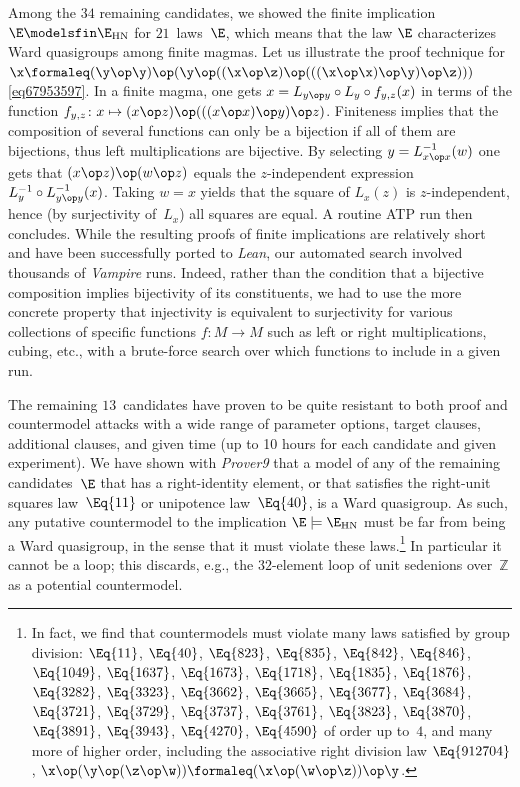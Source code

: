 Among the $34$ remaining candidates, we showed the finite implication $\E\modelsfin\E_{\mathrm{HN}}$ for $21$~laws~$\E$, which means that the law $\E$ characterizes Ward quasigroups among finite magmas.  Let us illustrate the proof technique for $\x \formaleq (\y \op \y) \op (\y \op ((\x \op \z) \op (((\x \op \x) \op \y) \op \z)))$ \eqref{eq67953597}.  In a finite magma, one gets $x = L_{y\op y} \circ L_y \circ f_{y,z}(x)$ in terms of the function $f_{y,z}\colon x \mapsto (x\op z) \op (((x \op x) \op y) \op z)$.  Finiteness implies that the composition of several functions can only be a bijection if all of them are bijections, thus left multiplications are bijective.  By selecting $y=L_{x\op x}^{-1}(w)$ one gets that $(x\op z)\op (w\op z)$ equals the $z$-independent expression $L_y^{-1} \circ L_{y\op y}^{-1}(x)$.  Taking $w=x$ yields that the square of $L_x(z)$ is $z$-independent, hence (by surjectivity of~$L_x$) all squares are equal.  A routine ATP run then concludes.
While the resulting proofs of finite implications are relatively short and have been successfully ported to \emph{Lean}, our automated search involved thousands of \emph{Vampire} runs.
Indeed, rather than the condition that a bijective composition implies bijectivity of its constituents, we had to use the more concrete property that injectivity is equivalent to surjectivity for various collections of specific functions $f\colon M\to M$ such as left or right multiplications, cubing, etc.\@, with a brute-force search over which functions to include in a given run.

The remaining $13$~candidates have proven to be quite resistant to both proof and countermodel attacks with a wide range of parameter options, target clauses, additional clauses, and given time (up to 10 hours for each candidate and given experiment).  We have shown with \emph{Prover9} that a model of any of the remaining candidates~$\E$ that has a right-identity element, or that satisfies the right-unit squares law~$\Eq{11}$ or unipotence law~$\Eq{40}$, is a Ward quasigroup.  As such, any putative countermodel to the implication $\E\models\E_{\mathrm{HN}}$ must be far from being a Ward quasigroup, in the sense that it must violate these laws.\footnote{In fact, we find that countermodels must violate many laws satisfied by group division: $\Eq{11}$, $\Eq{40}$, $\Eq{823}$, $\Eq{835}$, $\Eq{842}$, $\Eq{846}$, $\Eq{1049}$, $\Eq{1637}$, $\Eq{1673}$, $\Eq{1718}$, $\Eq{1835}$, $\Eq{1876}$, $\Eq{3282}$, $\Eq{3323}$, $\Eq{3662}$, $\Eq{3665}$, $\Eq{3677}$, $\Eq{3684}$, $\Eq{3721}$, $\Eq{3729}$, $\Eq{3737}$, $\Eq{3761}$, $\Eq{3823}$, $\Eq{3870}$, $\Eq{3891}$, $\Eq{3943}$, $\Eq{4270}$, $\Eq{4590}$ of order up to~$4$, and many more of higher order, including the associative right division law $\Eq{912704}$, $\x\op(\y\op(\z\op\w)) \formaleq(\x\op(\w\op\z))\op\y$.}  In particular it cannot be a loop; this discards, e.g., the $32$-element loop of unit sedenions over~$\mathbb{Z}$ as a potential countermodel.

